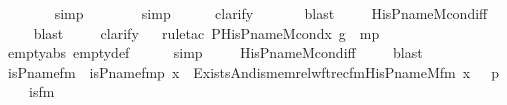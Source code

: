 \begin{isabellebody}
\ \ \ \ \ \ \isamarkupfalse%
\ simp\ \isanewline
\ \ \ \ \ \isamarkupfalse%
\ simp\ \isanewline
\ \ \ \ \isamarkupfalse%
{\isacharparenleft}{\kern0pt}clarify{\isacharparenright}{\kern0pt}\ \isanewline
\ \ \ \ \isamarkupfalse%
\ blast\ \isanewline
\ \ \isamarkupfalse%
\ His{\isacharunderscore}{\kern0pt}P{\isacharunderscore}{\kern0pt}name{\isacharunderscore}{\kern0pt}M{\isacharunderscore}{\kern0pt}cond{\isacharunderscore}{\kern0pt}iff\ \isanewline
\ \ \ \isamarkupfalse%
\ blast\ \isanewline
\ \ \isamarkupfalse%
\ clarify\isanewline
\ \ \isamarkupfalse%
{\isacharparenleft}{\kern0pt}rule{\isacharunderscore}{\kern0pt}tac\ P{\isacharequal}{\kern0pt}{\isachardoublequoteopen}{\isasymnot}His{\isacharunderscore}{\kern0pt}P{\isacharunderscore}{\kern0pt}name{\isacharunderscore}{\kern0pt}M{\isacharunderscore}{\kern0pt}cond{\isacharparenleft}{\kern0pt}x{\isacharprime}{\kern0pt}{\isacharcomma}{\kern0pt}\ g{\isacharparenright}{\kern0pt}{\isachardoublequoteclose}\ \ mp{\isacharparenright}{\kern0pt}\isanewline
\ \ \isamarkupfalse%
\ empty{\isacharunderscore}{\kern0pt}abs\ empty{\isacharunderscore}{\kern0pt}def\ \isanewline
\ \ \ \isamarkupfalse%
\ simp\ \isanewline
\ \ \isamarkupfalse%
\ His{\isacharunderscore}{\kern0pt}P{\isacharunderscore}{\kern0pt}name{\isacharunderscore}{\kern0pt}M{\isacharunderscore}{\kern0pt}cond{\isacharunderscore}{\kern0pt}iff\ \isanewline
\ \ \isamarkupfalse%
\ blast\ \isanewline
\ \ \isamarkupfalse%
%
\endisatagproof
{\isafoldproof}%
%
\isadelimproof
\isanewline
%
\endisadelimproof
\isanewline
{}\isamarkupfalse%
\isanewline
\isanewline
{}\isamarkupfalse%
\ is{\isacharunderscore}{\kern0pt}P{\isacharunderscore}{\kern0pt}name{\isacharunderscore}{\kern0pt}fm\ \ {\isachardoublequoteopen}is{\isacharunderscore}{\kern0pt}P{\isacharunderscore}{\kern0pt}name{\isacharunderscore}{\kern0pt}fm{\isacharparenleft}{\kern0pt}p{\isacharcomma}{\kern0pt}\ x{\isacharparenright}{\kern0pt}\ {\isasymequiv}\ Exists{\isacharparenleft}{\kern0pt}And{\isacharparenleft}{\kern0pt}is{\isacharunderscore}{\kern0pt}memrel{\isacharunderscore}{\kern0pt}wftrec{\isacharunderscore}{\kern0pt}fm{\isacharparenleft}{\kern0pt}His{\isacharunderscore}{\kern0pt}P{\isacharunderscore}{\kern0pt}name{\isacharunderscore}{\kern0pt}M{\isacharunderscore}{\kern0pt}fm{\isacharcomma}{\kern0pt}\ x\ {\isacharhash}{\kern0pt}{\isacharplus}{\kern0pt}\ {}{\isacharcomma}{\kern0pt}\ p\ {\isacharhash}{\kern0pt}{\isacharplus}{\kern0pt}\ {}{\isacharcomma}{\kern0pt}\ {}{\isacharparenright}{\kern0pt}{\isacharcomma}{\kern0pt}\ is{\isacharunderscore}{\kern0pt}{}{\isacharunderscore}{\kern0pt}fm{\isacharparenleft}{\kern0pt}{}{\isacharparenright}{\kern0pt}{\isacharparenright}{\kern0pt}{\isacharparenright}{\kern0pt}{\isachardoublequoteclose}\ \isanewline

\end{isabellebody}
